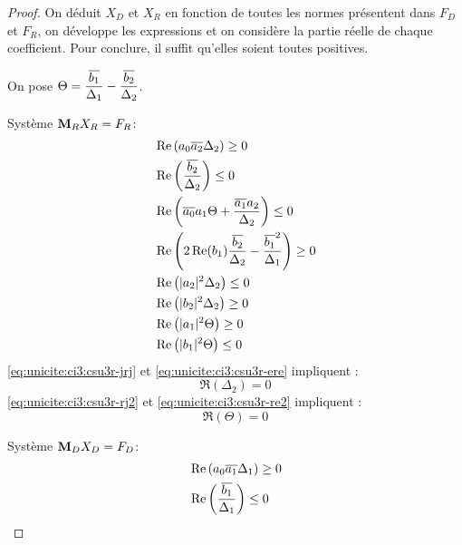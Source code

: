 \begin{proof}
    On déduit \(X_D\) et \(X_R\) en fonction de toutes les normes présentent dans \(F_D\) et \(F_R\), on développe les expressions et on considère la partie réelle de chaque coefficient. Pour conclure, il suffit qu'elles soient toutes positives.

    On pose \(\Theta=\dfrac{{\overline{b_1}}}{\Delta_1}-\dfrac{{\overline{b_2}}}{\Delta_2}\).

    \begin{minipage}{0.49\textwidth}
      {Système \(\mathbf{M}_RX_R=F_R\)}:
      \begin{align}
        \label{eq:unicite:ci3:csu3r-j2}&\operatorname{Re}\left(a_0{\overline{a_2}}\Delta_2\right) \ge 0 \\
        \label{eq:unicite:ci3:csu3r-e2}&\operatorname{Re}\left(\dfrac{{\overline{b_2}}}{\Delta_2}\right) \le 0 \\
        \label{eq:unicite:ci3:csu3r-jdj}&\operatorname{Re}\left({\overline{a_0}}a_1\Theta + \dfrac{{\overline{a_1}}a_2}{\Delta_2} \right)\le 0\\
        \label{eq:unicite:ci3:csu3r-ede}&\operatorname{Re}\left(2\operatorname{Re}(b_1)\dfrac{{\overline{b_2}}}{\Delta_2}-\dfrac{{\overline{b_1}}^2}{\Delta_1}\right) \ge 0\\
        \label{eq:unicite:ci3:csu3r-jrj}&\operatorname{Re}\left(|a_2|^2\Delta_2\right) \le 0 \\
        \label{eq:unicite:ci3:csu3r-ere}&\operatorname{Re}\left(|b_2|^2\Delta_2\right) \ge 0 \\
        \label{eq:unicite:ci3:csu3r-rj2}&\operatorname{Re}\left(|a_1|^2\Theta\right)\ge 0\\
        \label{eq:unicite:ci3:csu3r-re2}&\operatorname{Re}\left(|b_1|^2\Theta\right)\le 0
      \end{align}
      \eqref{eq:unicite:ci3:csu3r-jrj} et \eqref{eq:unicite:ci3:csu3r-ere} impliquent :
      \begin{equation}
        \Re\left(\Delta_2\right) = 0
      \end{equation}
      \eqref{eq:unicite:ci3:csu3r-rj2} et \eqref{eq:unicite:ci3:csu3r-re2} impliquent :
      \begin{equation}
        \Re\left(\Theta\right) = 0
      \end{equation}
    \end{minipage}
    \begin{minipage}{0.49\textwidth}
      {Système \(\mathbf{M}_DX_D=F_D\)}:
      \begin{align}
        \label{eq:unicite:ci3:csu3d-j2}&\Re\left(a_0\conj{a_1}\Delta_1\right) \ge 0 \\
        \label{eq:unicite:ci3:csu3d-e2}&\Re\left(\frac{\conj{b_1}}{\Delta_1}\right) \le 0 \\

\end{align}
\end{minipage}
\end{proof}

